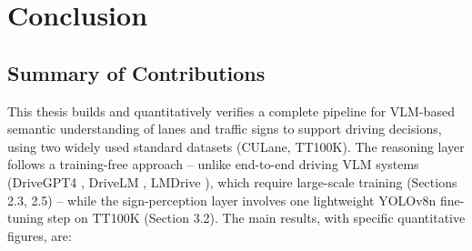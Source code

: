 \documentclass[12pt,a4paper]{report}
\begin{document}
\chapter{Conclusion}

\section{Summary of Contributions}

This thesis builds and quantitatively verifies a complete pipeline for VLM-based semantic understanding of lanes and traffic signs to support driving decisions, using two widely used standard datasets (CULane, TT100K). The reasoning layer follows a training-free approach -- unlike end-to-end driving VLM systems (DriveGPT4 \cite{xu2024drivegpt4}, DriveLM \cite{sima2024drivelm}, LMDrive \cite{shao2024lmdrive}), which require large-scale training (Sections 2.3, 2.5) -- while the sign-perception layer involves one lightweight YOLOv8n fine-tuning step on TT100K (Section 3.2). The main results, with specific quantitative figures, are:
\end{document}
